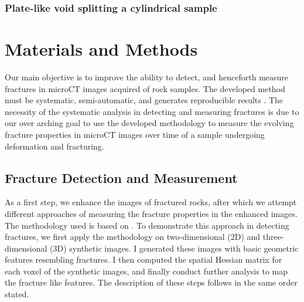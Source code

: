 \documentclass{edger}
\begin{document}
\subsubsection{Plate-like void splitting a cylindrical sample}

\section{Materials and Methods}
	Our main objective is to improve the ability to detect, and henceforth measure fractures in microCT images acquired of rock samples. The developed method must be systematic, semi-automatic, and generates reproducible results . The necessity of the systematic analysis in detecting and measuring fractures is due to our over arching goal to use the developed methodology to measure the evolving fracture properties in microCT images over time of a sample undergoing deformation and fracturing.  

\subsection{Fracture Detection and Measurement}
	As a first step, we enhance the images of fractured rocks, after which we attempt different approaches of measuring the fracture properties in the enhanced images. The methodology used is based on \cite{Voorn2013}.   To demonstrate this approach in detecting fractures, we first apply the methodology on two-dimensional (2D) and three-dimensional (3D) synthetic images. I generated these images with basic geometric features resembling fractures. I then computed the spatial Hessian matrix for each voxel of the synthetic images, and finally conduct further analysis to map the fracture like features. The description of these steps follows in the same order stated. 
\end{document}
